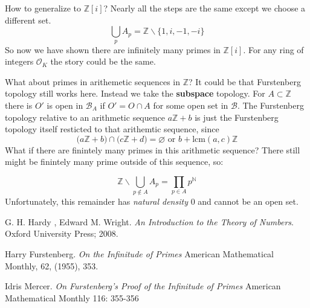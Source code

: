 \documentclass[12pt]{article}
\begin{document}
{\noindent How to generalize to $\mathbb{Z}[i]$?  Nearly all the steps are the same except we choose a different set.
$$  \bigcup_p A_p  = \mathbb{Z} \backslash \{1,i,-1,-i \}$$
So now we have shown there are infinitely many primes in $\mathbb{Z}[i]$.  For any ring of integers $\mathcal{O}_K$ the story could be the same. \newline

\noindent What about primes in arithemetic sequences in $\mathbb{Z}$?  It could be that Furstenberg topology still works here.  Instead we take the \textbf{subspace} topology.  For $A \subset \mathbb{Z}$ there is $O'$ is open in $\mathcal{B}_A$ if $O'= O \cap A$ for some open set in $\mathcal{B}$.  The Furstenberg topology relative to an arithmetic sequence $ a \mathbb{Z} + b$ is just the Furstenberg topology itself resticted to that arithemtic sequence, since 
$$ \big(a \mathbb{Z} + b \big) \cap \big(c \mathbb{Z} + d \big) = \varnothing \text{ or } b + \mathrm{lcm}(a,c) \mathbb{Z} $$
What if there are finintely many primes in this arithmetic sequence?  There still might be finintely many prime outside of this sequence, so:

$$ \mathbb{Z} \backslash \bigcup_{p \notin A } A_p =  \prod_{p \in A} p^\mathbb{N}$$
Unfortunately, this remainder has \textit{natural density} $0$ and cannot be an open set.

\begin{thebibliography}{9}
G. H. Hardy , Edward M. Wright.
\textit{An Introduction to the Theory of Numbers}. 
Oxford University Press; 2008.
 
Harry Furstenberg.  \textit{On the Infinitude of Primes} American Mathematical Monthly, 62, (1955), 353.

Idris Mercer.  \textit{On Furstenberg's Proof of the
Infinitude of Primes} American Mathematical Monthly 116: 355-356
 
 

\end{thebibliography}
}
\end{document}

